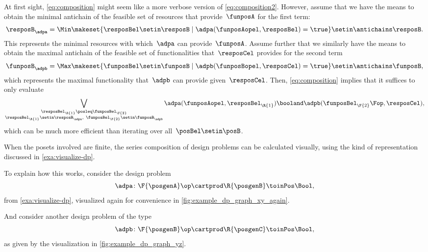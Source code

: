 \begin{remark}
    At first sight, \cref{eq:composition} might seem like a more verbose version of \cref{eq:composition2}.
    However, assume that we have the means to obtain the minimal antichain of the feasible set of resources that provide~$\funposA$ for the first term:
    \begin{equation}
        \resposB_\adpa = \Min \makeset{\resposBel\setin \resposB \mid \adpa(\funposAopel,\resposBel)=\true} \setin \antichains \resposB.
    \end{equation}
    This represents the minimal resources with which~$\adpa$ can provide~$\funposA$.
    Assume further that we similarly have the means to obtain the maximal antichain of the feasible set of functionalities that~$\resposCel$ provides for the second term
    \begin{equation}
        \funposB_\adpb = \Max \makeset{\funposBel\setin \funposB \mid \adpb(\funposBopel,\resposCel)=\true} \setin \antichains \funposB,
    \end{equation}
    which represents the maximal functionality that~$\adpb$ can provide given~$\resposCel$.
    Then, \cref{eq:composition} implies that it suffices to only evaluate
    \begin{equation}
        \bigvee_{\substack{\resposBel_\R{1}\posleq\funposBel_\F{2} \\ \resposBel_\R{1}\setin \resposB_\adpa,~ \funposBel_\F{2}\setin\funposB_\adpb }} \adpa(\funposAopel,\resposBel_\R{1}) \booland \adpb(\funposBel_\F{2}\Fop,\resposCel),
    \end{equation}
    which can be much more efficient than iterating over all~$\posBel\setin \posB$.
\end{remark}

When the posets involved are finite, the series composition of design problems can be calculated visually, using the kind of representation discussed in \cref{exa:visualize-dp}.
\begin{marginfigure}
    \centering
    \caption{ }
    \label{fig:example_dp_graph_xy_again}
\end{marginfigure}
To explain how this works, consider the design problem
\begin{equation}
    \adpa \colon \F{\posgenA} \op \cartprod  \R{\posgenB} \toinPos \Bool,
\end{equation}
from \cref{exa:visualize-dp}, visualized again for convenience in \cref{fig:example_dp_graph_xy_again}.
\begin{marginfigure}
    \centering
    \caption{ }
    \label{fig:example_dp_graph_yz}
\end{marginfigure}
And consider another design problem of the type
\begin{equation}
    \adpb \colon \F{\posgenB} \op \cartprod  \R{\posgenC} \toinPos \Bool,
\end{equation}
as given by the visualization in \cref{fig:example_dp_graph_yz}.

